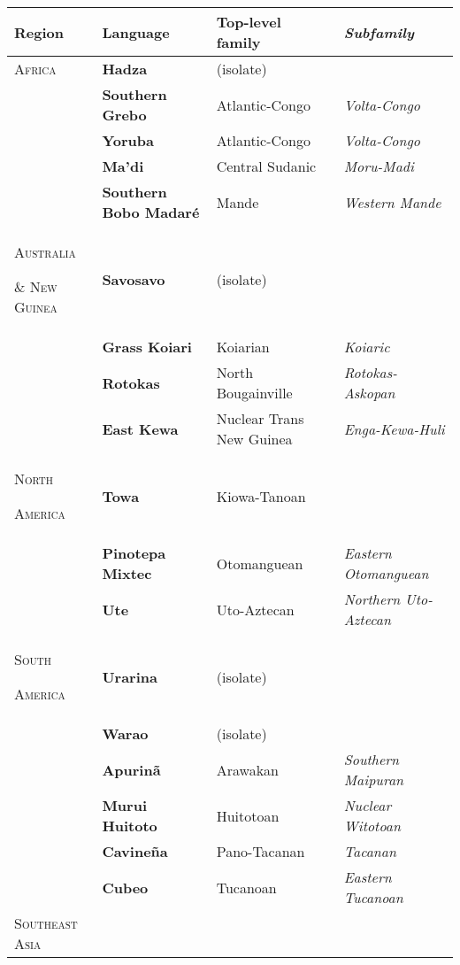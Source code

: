 \documentclass[12pt]{article}
\begin{document}
\begin{flushleft}
\tablefirsthead{}
\tablehead{}
\tabletail{}
\tablelasttail{}
\begin{supertabular}{m{1.2205598in}m{1.6719599in}m{1.6400598in}m{1.6420599in}}
\hline
{\bfseries Region} &
{\bfseries Language} &
{\bfseries Top-level family} &
{\bfseries\itshape Subfamily}\\\hline
{\scshape Africa} &
{\bfseries Hadza} &
(isolate) &
\\\hhline{-~~~}
 &
{\bfseries Southern Grebo} &
Atlantic-Congo &
{\itshape Volta-Congo}\\
 &
{\bfseries Yoruba} &
Atlantic-Congo &
{\itshape Volta-Congo}\\
 &
{\bfseries Ma’di} &
Central Sudanic &
{\itshape Moru-Madi}\\
 &
{\bfseries Southern Bobo Madaré} &
Mande &
{\itshape Western Mande}\\\hline
{\scshape Australia }

{\scshape \& New Guinea} &
{\bfseries Savosavo} &
(isolate) &
\\\hhline{-~~~}
 &
{\bfseries Grass Koiari} &
Koiarian &
{\itshape Koiaric}\\
 &
{\bfseries Rotokas} &
North Bougainville &
{\itshape Rotokas-Askopan}\\
 &
{\bfseries East Kewa} &
Nuclear Trans New Guinea &
{\itshape Enga-Kewa-Huli}\\\hline
{\scshape North }

{\scshape America} &
{\bfseries Towa} &
Kiowa-Tanoan &
\\\hhline{-~~~}
 &
{\bfseries Pinotepa Mixtec} &
Otomanguean &
{\itshape Eastern Otomanguean}\\
 &
{\bfseries Ute} &
Uto-Aztecan &
{\itshape Northern Uto-Aztecan}\\\hline
{\scshape South }

{\scshape America} &
{\bfseries Urarina} &
(isolate) &
\\\hhline{-~~~}
 &
{\bfseries Warao} &
(isolate) &
\\
 &
{\bfseries Apurinã} &
Arawakan &
{\itshape Southern Maipuran}\\
 &
{\bfseries Murui Huitoto} &
Huitotoan &
{\itshape Nuclear Witotoan}\\
 &
{\bfseries Cavineña} &
Pano-Tacanan &
{\itshape Tacanan}\\
 &
{\bfseries Cubeo} &
Tucanoan &
{\itshape Eastern Tucanoan}\\\hline
{\scshape Southeast Asia }


\end{supertabular}
\end{flushleft}
\end{document}

